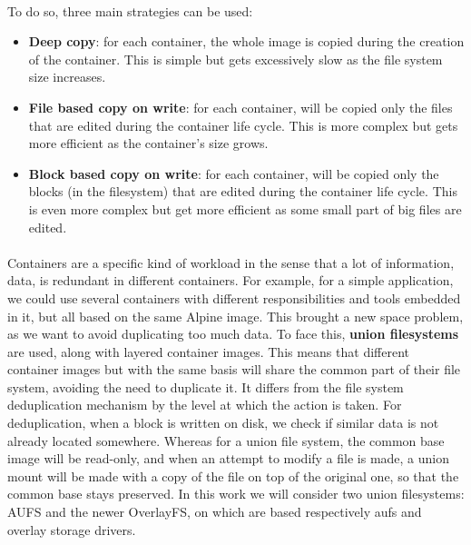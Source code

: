 \paragraph{} To do so, three main strategies can be used:
\begin{itemize}
\renewcommand\labelitemi{--}
  \item \textbf{Deep copy}: for each container, the whole image is copied during the creation of the container.  This is simple but gets excessively slow as the file system size increases.
  \item \textbf{File based copy on write}: for each container, will be copied only the files that are edited during the container life cycle.  This is more complex but gets more efficient as the container's size grows.
  \item \textbf{Block based copy on write}: for each container, will be copied only the blocks (in the filesystem) that are edited during the container life cycle.  This is even more complex but get more efficient as some small part of big files are edited.
\end{itemize}

\paragraph{}Containers are a specific kind of workload in the sense that a lot of information, data, is redundant in different containers.  For example, for a simple application, we could use several containers with different responsibilities and tools embedded in it, but all based on the same Alpine image.  This brought a new space problem, as we want to avoid duplicating too much data.  To face this, \textbf{union filesystems} are used, along with layered container images.  This means that different container images but with the same basis will share the common part of their file system, avoiding the need to duplicate it.  It differs from the file system deduplication mechanism by the level at which the action is taken.  For deduplication, when a block is written on disk, we check if similar data is not already located somewhere.  Whereas for a union file system, the common base image will be read-only, and when an attempt to modify a file is made, a union mount will be made with a copy of the file on top of the original one, so that the common base stays preserved.  In this work we will consider two union filesystems: AUFS and the newer OverlayFS, on which are based respectively aufs and overlay storage drivers.

